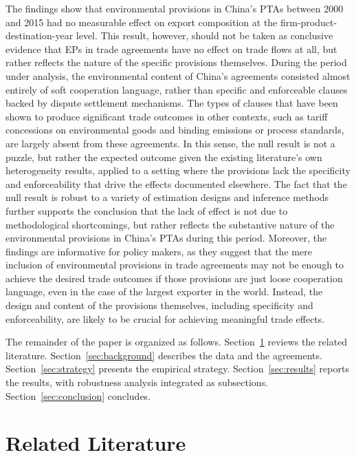 \documentclass[12pt]{article}
\begin{document}
The findings show that environmental provisions in China's PTAs between 2000 and 2015 had no measurable effect on export composition at the firm-product-destination-year level. This result, however, should not be taken as conclusive evidence that EPs in trade agreements have no effect on trade flows at all, but rather reflects the nature of the specific provisions themselves. During the period under analysis, the environmental content of China's agreements consisted almost entirely of soft cooperation language, rather than specific and enforceable clauses backed by dispute settlement mechanisms. The types of clauses that have been shown to produce significant trade outcomes in other contexts, such as tariff concessions on environmental goods and binding emissions or process standards, are largely absent from these agreements. In this sense, the null result is not a puzzle, but rather the expected outcome given the existing literature's own heterogeneity results, applied to a setting where the provisions lack the specificity and enforceability that drive the effects documented elsewhere. The fact that the null result is robust to a variety of estimation designs and inference methods further supports the conclusion that the lack of effect is not due to methodological shortcomings, but rather reflects the substantive nature of the environmental provisions in China's PTAs during this period. Moreover, the findings are informative for policy makers, as they suggest that the mere inclusion of environmental provisions in trade agreements may not be enough to achieve the desired trade outcomes if those provisions are just loose cooperation language, even in the case of the largest exporter in the world. Instead, the design and content of the provisions themselves, including specificity and enforceability, are likely to be crucial for achieving meaningful trade effects.

The remainder of the paper is organized as follows. Section~\ref{sec:lit} reviews the related literature. Section~\ref{sec:background} describes the data and the agreements. Section~\ref{sec:strategy} presents the empirical strategy. Section~\ref{sec:results} reports the results, with robustness analysis integrated as subsections. Section~\ref{sec:conclusion} concludes.

\section{Related Literature}\label{sec:lit}
\end{document}
